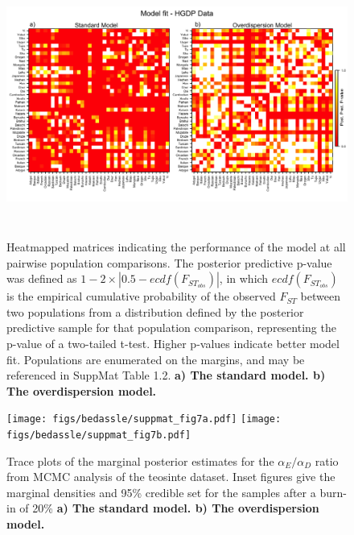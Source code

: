 \begin{figure}[ht!]
\begin{center}
  \includegraphics[width=6in,height=3.4in]{figs/bedassle/suppmat_fig6.png}
 \caption{
\textmd{Heatmapped matrices indicating the performance of the model at all pairwise population comparisons.  The posterior predictive p-value was defined as 
		$1-2 \times |0.5-ecdf(F_{ST_{obs}})|$, in which $ecdf(F_{ST_{obs}})$ is the empirical cumulative probability of the observed $F_{ST}$ between two populations from a distribution defined by the posterior predictive sample for that population comparison, representing the p-value of a two-tailed t-test.  Higher p-values indicate better model fit.  Populations are enumerated on the margins, and may be referenced in SuppMat Table 1.2.}
	\bf{a)}
 		\textmd{The standard model.}
	\bf{b)}
 		\textmd{The overdispersion model.}
\label{sfig:him.pps.pval}
  }
\end{center}
\end{figure}

\begin{figure}[ht!]
\begin{center}
  \texttt{[image: figs/bedassle/suppmat\_fig7a.pdf]}
  \texttt{[image: figs/bedassle/suppmat\_fig7b.pdf]}  
 \caption{
\textmd{Trace plots of the marginal posterior estimates for the $\alpha_{E} / \alpha_{D}$ ratio from MCMC analysis of the teosinte dataset.  Inset figures 
		give the marginal densities and 95\% credible set for the samples after a burn-in of 20\%}
	\bf{a)}
 		\textmd{The standard model.}
	\bf{b)}
 		\textmd{The overdispersion model.}
\label{sfig:zea_traceplot}
  }
\end{center}
\end{figure}


